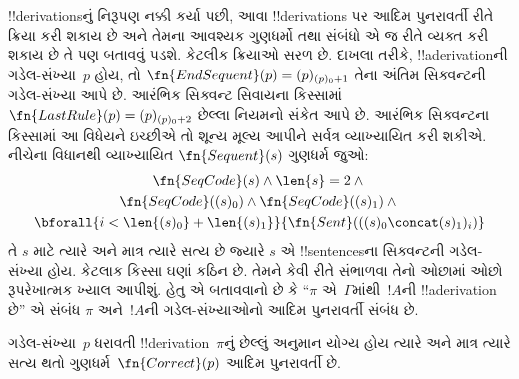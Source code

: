 \documentclass[../../../include/open-logic-section]{subfiles}
\begin{document}
\begin{explain}
!!{derivation}sનું નિરૂપણ નક્કી કર્યા પછી,
આવા !!{derivation}s પર આદિમ પુનરાવર્તી રીતે ક્રિયા
કરી શકાય છે અને તેમના આવશ્યક ગુણધર્મો
તથા સંબંધો એ જ રીતે વ્યક્ત કરી શકાય છે
તે પણ બતાવવું પડશે. કેટલીક ક્રિયાઓ
સરળ છે. દાખલા તરીકે, !!a{derivation}ની
ગડેલ-સંખ્યા~$p$ હોય, તો
$\fn{EndSequent}(p) = (p)_{(p)_0+1}$
તેના અંતિમ સિક્વન્ટની ગડેલ-સંખ્યા આપે છે.
આરંભિક સિક્વન્ટ સિવાયના કિસ્સામાં
$\fn{LastRule}(p) = (p)_{(p)_0+2}$
છેલ્લા નિયમનો સંકેત આપે છે.
આરંભિક સિક્વન્ટના કિસ્સામાં આ વિધેયને
ઇચ્છીએ તો શૂન્ય મૂલ્ય આપીને સર્વત્ર
વ્યાખ્યાયિત કરી શકીએ.
નીચેના વિધાનથી વ્યાખ્યાયિત
$\fn{Sequent}(s)$ ગુણધર્મ જુઓ:
\begin{multline*}
  \fn{SeqCode}(s) \land \len{s} = 2 \land {}\\
  \fn{SeqCode}((s)_0) \land \fn{SeqCode}((s)_1) \land {}\\
  \bforall{i<\len{(s)_0} + \len{(s)_1}}{\fn{Sent}(((s)_0 \concat (s)_1)_i)}
\end{multline*}
તે $s$ માટે ત્યારે અને માત્ર ત્યારે
સત્ય છે જ્યારે $s$ એ !!{sentence}sના
સિક્વન્ટની ગડેલ-સંખ્યા હોય. કેટલાક
કિસ્સા ઘણાં કઠિન છે. તેમને કેવી રીતે
સંભાળવા તેનો ઓછામાં ઓછો રૂપરેખાત્મક
ખ્યાલ આપીશું. હેતુ એ બતાવવાનો છે કે
``$\pi$ એ~$\Gamma$માંથી~$!A$ની
!!a{derivation} છે'' એ સંબંધ
$\pi$ અને~$!A$ની ગડેલ-સંખ્યાઓનો
આદિમ પુનરાવર્તી સંબંધ છે.
\end{explain}

\begin{prop}
  ગડેલ-સંખ્યા~$p$ ધરાવતી
  !!{derivation}~$\pi$નું છેલ્લું અનુમાન
  યોગ્ય હોય ત્યારે અને માત્ર ત્યારે સત્ય
  થતો ગુણધર્મ~$\fn{Correct}(p)$ આદિમ
  પુનરાવર્તી છે.
\end{prop}
\end{document}
